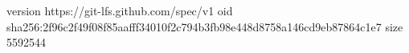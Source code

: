 version https://git-lfs.github.com/spec/v1
oid sha256:2f96c2f49f08f85aafff34010f2c794b3fb98e448d8758a146cd9eb87864c1e7
size 5592544
